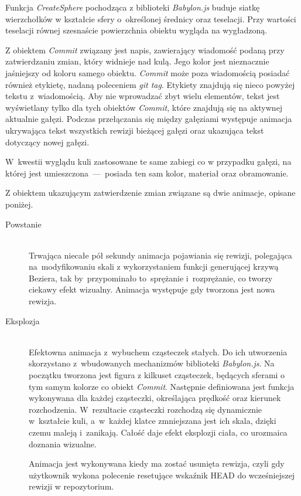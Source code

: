 \documentclass[12pt,a4paper,polish,thesis]{dcsbook}
\begin{document}
{	Funkcja \textit{CreateSphere} pochodząca z biblioteki \textit{Babylon.js} buduje siatkę wierzchołków w kształcie sfery o~określonej średnicy oraz teselacji. Przy wartości teselacji równej szesnaście powierzchnia obiektu wygląda na wygładzoną.

	Z obiektem \textit{Commit} związany jest napis, zawierający wiadomość podaną przy zatwierdzaniu zmian, który widnieje nad kulą.
	Jego kolor jest nieznacznie jaśniejszy od koloru samego obiektu. \textit{Commit} może poza wiadomością posiadać również etykietę, nadaną poleceniem \textit{git tag}. Etykiety znajdują się nieco powyżej tekstu z~wiadomością. Aby nie wprowadzać zbyt wielu elementów, tekst jest wyświetlany tylko dla tych obiektów \textit{Commit}, które znajdują się na aktywnej aktualnie gałęzi. Podczas przełączania się między gałęziami występuje animacja ukrywająca tekst wszystkich rewizji bieżącej gałęzi oraz ukazująca tekst dotyczący nowej gałęzi.

	 W~kwestii wyglądu kuli zastosowane te same zabiegi co w przypadku gałęzi, na której jest umieszczona~---~posiada ten sam kolor, materiał oraz obramowanie.

	Z obiektem ukazującym zatwierdzenie zmian związane są dwie animacje, opisane poniżej.
	\begin{description}
		\item[Powstanie] \hfill \\
		Trwająca niecałe pół sekundy animacja pojawiania się rewizji, polegająca na~modyfikowaniu skali z wykorzystaniem funkcji generującej krzywą Beziera, tak by~przypominało to~sprężanie i~rozprężanie, co tworzy ciekawy efekt wizualny. Animacja występuje gdy tworzona jest nowa rewizja.

		\item[Eksplozja] \hfill \\
		Efektowna animacja z~wybuchem cząsteczek stałych. Do ich utworzenia skorzystano z~wbudowanych mechanizmów biblioteki \textit{Babylon.js}. Na początku tworzona jest figura z kilkuset cząsteczek, będących sferami o tym samym kolorze co obiekt \textit{Commit}. Następnie definiowana jest funkcja wykonywana dla każdej cząsteczki, określająca prędkość oraz kierunek rozchodzenia. W~rezultacie cząsteczki rozchodzą się dynamicznie w~kształcie kuli, a~w~każdej klatce zmniejszana jest ich skala, dzięki czemu maleją i~zanikają. Całość daje efekt eksplozji ciała, co urozmaica doznania wizualne.

		Animacja jest wykonywana kiedy ma zostać usunięta rewizja, czyli gdy użytkownik wykona polecenie resetujące wskaźnik HEAD do wcześniejszej rewizji w repozytorium.


\end{description}}
\end{document}
